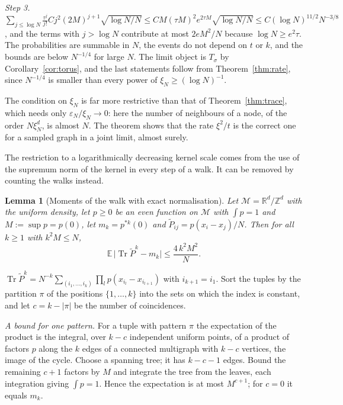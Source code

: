 \documentclass[11pt,a4paper]{article}
\makeatletter
\theoremstyle{stmt}
\newtheorem{lemma}[theorem]{Lemma}
\theoremstyle{defn}
\theoremstyle{rmk}
\renewenvironment{proof}[1][\proofname]{\par\pushQED{\qed}\normalfont\topsep6\p@\@plus6\p@\relax
  \trivlist\item[\hskip\labelsep{\sffamily\itshape\small #1.}]\ignorespaces}{\popQED\endtrivlist\@endpefalse}
\numberwithin{equation}{section}
\DeclareMathOperator{\Tr}{Tr}
\newcommand{\M}{\mathcal{M}}
\newcommand{\R}{\mathbb{R}}
\makeatother
\begin{document}
{\begin{proof}
\emph{Step 3.} $\sum_{j\le\log N}\frac{\tau^j}{j!}Cj^2(2M)^{j+1}\sqrt{\log N/N}\le CM(\tau M)^2e^{2\tau M}\sqrt{\log N/N}\le C(\log N)^{11/2}N^{-3/8}$, and the terms with $j>\log N$ contribute at most $2eM^2/N$ because $\log N\ge e^2\tau$. The probabilities are summable in $N$, the events do not depend on $t$ or $k$, and the bounds are below $N^{-1/4}$ for large $N$. The limit object is $T_\sigma$ by Corollary~\ref{cor:torus}, and the last statements follow from Theorem~\ref{thm:rate}, since $N^{-1/4}$ is smaller than every power of $\xi_N\ge(\log N)^{-1}$.
\end{proof}

The condition on $\xi_N$ is far more restrictive than that of Theorem~\ref{thm:trace}, which needs only $\varepsilon_N/\xi_N\to0$: here the number of neighbours of a node, of the order $N\xi_N^d$, is almost $N$. The theorem shows that the rate $\xi^2/t$ is the correct one for a sampled graph in a joint limit, almost surely.

The restriction to a logarithmically decreasing kernel scale comes from the use of the supremum norm of the kernel in every step of a walk. It can be removed by counting the walks instead.

\begin{lemma}[Moments of the walk with exact normalisation]\label{lem:oraclemoments}
Let $\M=\R^d/\mathbb Z^d$ with the uniform density, let $p\ge0$ be an even function on $\M$ with $\int p=1$ and $M:=\sup p=p(0)$, let $m_k=p^{*k}(0)$ and $\tilde P_{ij}=p(x_i-x_j)/N$. Then for all $k\ge1$ with $k^2M\le N$,
\[
\mathbb E\,\big|\Tr\tilde P^k-m_k\big|\le\frac{4\,k^2M^2}{N}.
\]
\end{lemma}

\begin{proof}
$\Tr\tilde P^k=N^{-k}\sum_{(i_1,\dots,i_k)}\prod_lp(x_{i_l}-x_{i_{l+1}})$ with $i_{k+1}=i_1$. Sort the tuples by the partition $\pi$ of the positions $\{1,\dots,k\}$ into the sets on which the index is constant, and let $c=k-|\pi|$ be the number of coincidences.

\emph{A bound for one pattern.} For a tuple with pattern $\pi$ the expectation of the product is the integral, over $k-c$ independent uniform points, of a product of factors $p$ along the $k$ edges of a connected multigraph with $k-c$ vertices, the image of the cycle. Choose a spanning tree; it has $k-c-1$ edges. Bound the remaining $c+1$ factors by $M$ and integrate the tree from the leaves, each integration giving $\int p=1$. Hence the expectation is at most $M^{c+1}$; for $c=0$ it equals $m_k$.


\end{proof}}
\end{document}
